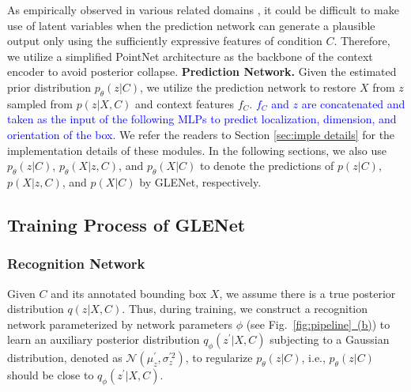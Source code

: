 \documentclass[twocolumn]{svjour3}
\begin{document}
As empirically observed in various related domains \citep{goyal2017z}, it could be difficult to make use of latent variables when the prediction network can generate a plausible output only using the sufficiently expressive features of condition $C$. Therefore, we utilize a simplified PointNet architecture as the backbone of the context encoder to avoid posterior collapse. 
\noindent\textbf{Prediction Network.}
Given the estimated prior distribution $p_{\theta}(z \vert C)$, we utilize the prediction network to restore $X$ from $z$ sampled from $p(z \vert X,C)$ and context features $f_{C}$. 
\textcolor{blue}{$f_{C}$ and $z$ are concatenated and taken as the input of the following MLPs to predict localization, dimension, and orientation of the box.}
\fi 
We refer the readers to Section \ref{sec:imple details} for the implementation details of these modules. In the following sections, we also use $p_{\theta}(z \vert C)$, $p_{\theta}(X \vert z,C)$, and $p_{\theta}(X\vert C)$ to denote the predictions of $p(z \vert C)$, $p(X \vert z,C)$, and $p(X\vert C)$ by GLENet, respectively.



\subsection{Training Process of GLENet}
\subsubsection{Recognition Network}
Given $C$ and its annotated bounding box $X$, we assume there is a true posterior distribution $q(z \vert X,C)$. Thus, during training, we construct a recognition network parameterized by network parameters $\phi$ (see Fig.~\hyperref[fig:pipeline]{\ref{fig:pipeline}~(b)}) to learn an auxiliary posterior distribution $q_{\phi}(z^{\prime} \vert X,C)$ subjecting to a Gaussian distribution, denoted as $\mathcal{N}(\mu_{z}^{\prime}, \sigma_z^{\prime2})$, to regularize $p_{\theta}(z \vert C)$, i.e., $p_{\theta}(z \vert C)$ should be close to $q_{\phi}(z^{\prime} \vert X,C)$.
\end{document}

